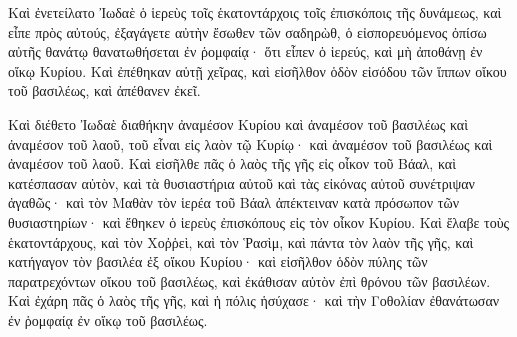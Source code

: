 {Καὶ ἐνετείλατο Ἰωδαὲ ὁ ἱερεὺς τοῖς ἑκατοντάρχοις τοῖς ἐπισκόποις τῆς δυνάμεως, καὶ εἶπε πρὸς αὐτούς, ἐξαγάγετε αὐτὴν ἔσωθεν τῶν σαδηρὼθ, ὁ εἰσπορευόμενος ὀπίσω αὐτῆς θανάτῳ θανατωθήσεται ἐν ῥομφαίᾳ· ὅτι εἶπεν ὁ ἱερεύς, καὶ μὴ ἀποθάνῃ ἐν οἴκῳ Κυρίου.
Καὶ ἐπέθηκαν αὑτῇ χεῖρας, καὶ εἰσῆλθον ὁδὸν εἰσόδου τῶν ἵππων οἴκου τοῦ βασιλέως, καὶ ἀπέθανεν ἐκεῖ.
\par }{\PP {}Καὶ διέθετο Ἰωδαὲ διαθήκην ἀναμέσον Κυρίου καὶ ἀναμέσον τοῦ βασιλέως καὶ ἀναμέσον τοῦ λαοῦ, τοῦ εἶναι εἰς λαὸν τῷ Κυρίῳ· καὶ ἀναμέσον τοῦ βασιλέως καὶ ἀναμέσον τοῦ λαοῦ.
Καὶ εἰσῆλθε πᾶς ὁ λαὸς τῆς γῆς εἰς οἶκον τοῦ Βάαλ, καὶ κατέσπασαν αὐτὸν, καὶ τὰ θυσιαστήρια αὐτοῦ καὶ τὰς εἰκόνας αὐτοῦ συνέτριψαν ἀγαθῶς· καὶ τὸν Μαθὰν τὸν ἱερέα τοῦ Βάαλ ἀπέκτειναν κατὰ πρόσωπον τῶν θυσιαστηρίων· καὶ ἔθηκεν ὁ ἱερεὺς ἐπισκόπους εἰς τὸν οἶκον Κυρίου.
Καὶ ἔλαβε τοὺς ἑκατοντάρχους, καὶ τὸν Χοῤῥεὶ, καὶ τὸν Ῥασὶμ, καὶ πάντα τὸν λαὸν τῆς γῆς, καὶ κατήγαγον τὸν βασιλέα ἐξ οἴκου Κυρίου· καὶ εἰσῆλθον ὁδὸν πύλης τῶν παρατρεχόντων οἴκου τοῦ βασιλέως, καὶ ἐκάθισαν αὐτὸν ἐπὶ θρόνου τῶν βασιλέων.
Καὶ ἐχάρη πᾶς ὁ λαὸς τῆς γῆς, καὶ ἡ πόλις ἡσύχασε· καὶ τὴν Γοθολίαν ἐθανάτωσαν ἐν ῥομφαίᾳ ἐν οἴκῳ τοῦ βασιλέως.

}

